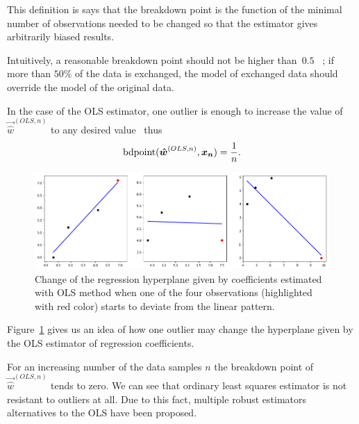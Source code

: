 This definition is says that the breakdown point is the function of the minimal number of observations needed to be changed so that the estimator gives arbitrarily biased results.

Intuitively, a reasonable breakdown point should not be higher than~$0.5$~\cite{rouss:1986} ; if more than $50\%$ of the data is exchanged, the model of exchanged data should override the model of the original data. 

In the case of the OLS estimator, one outlier is enough to increase the value of $\vec{\hat{w}}^{(OLS,n)}$ to any desired value~\cite{agullo2001new} thus 
\begin{equation}
    \operatorname{bdpoint}(\boldsymbol{\hat{w}}^{(OLS,n)},\boldsymbol{x_n} ) = \frac{1}{n}.
\end{equation}

\begin{figure}[h]
    \centering
    \includegraphics[width=12cm]{img/outlier_regression}
    \caption{Change of the regression hyperplane given by coefficients estimated with OLS method when one of the four observations (highlighted with red color) starts to deviate from the linear pattern.}
    \label{figure:outlier:hyperplane}
\end{figure}

Figure~\ref{figure:outlier:hyperplane} gives us an idea of how one outlier may change the hyperplane given by the OLS estimator of regression coefficients.



    

For an increasing number of the data samples $n$ the breakdown point of $\vec{\hat{w}}^{(OLS,n)}$ tends to zero. We can see that ordinary least squares estimator is not resistant to outliers at all. Due to this fact, multiple robust estimators alternatives to the OLS have been proposed.




